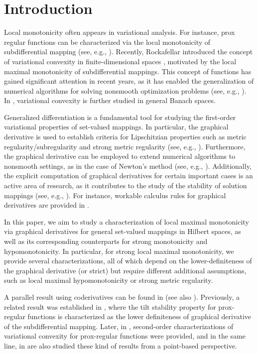 \documentclass[smallextended,envcountsect,envcountsame]{svjour3}
\newcounter{count}
\newcommand{\1}{\mathds{1}}
\begin{document}
	\section{Introduction}
    Local monotonicity often appears in variational analysis. For instance, prox regular functions can be characterized via the local monotonicity of subdifferential mapping (see, e.g., \cite{Poliquin1996, MR2113863}). Recently, Rockafellar introduced the concept of variational convexity in finite-dimensional spaces \cite{MR3995335}, motivated by the local maximal monotonicity of subdifferential mappings. This concept of functions has gained significant attention in recent years, as it has enabled the generalization of numerical algorithms for solving nonsmooth optimization problems (see, e.g., \cite{MR4550949,MR3995335}). In \cite{MR4784083}, variational convexity is further studied in general Banach spaces.

    Generalized differentiation is a fundamental tool for studying the first-order variational properties of set-valued mappings. In particular, the graphical derivative is used to establish criteria for Lipschitzian properties such as metric regularity/subregularity and strong metric regularity (see, e.g., \cite{MR2252233, MR3108434, MR3705353}). Furthermore, the graphical derivative can be employed to extend numerical algorithms to nonsmooth settings, as in the case of Newton's method (see, e.g., \cite{MR4252735, aragon2024coderivative}). Additionally, the explicit computation of graphical derivatives for certain important cases is an active area of research, as it contributes to the study of the stability of solution mappings (see, e.g., \cite{MR3288139, MR3485980, MR4769808}). For instance, workable calculus rules for graphical derivatives are provided in \cite{MR3428695, MR3693740}. 

    In this paper, we aim to study a characterization of local maximal monotonicity via graphical derivatives for general set-valued mappings in Hilbert spaces, as well as its corresponding counterparts for strong monotonicity and hypomonotonicity. In particular, for strong local maximal monotonicity, we provide several characterizations, all of which depend on the lower-definiteness of the graphical derivative (or strict) but require different additional assumptions, such as local maximal hypomonotonicity or strong metric regularity.
    

    A parallel result using coderivatives can be found in \cite[Theorem 3.4]{MR3485980} (see also \cite[Theorem 6.3]{khanh2025local}). Previously, a related result was established in \cite[Theorem 3.3]{MR3843842}, where the tilt stability property for prox-regular functions is characterized as the lower definiteness of graphical derivative of the subdifferential mapping. Later, in \cite[Theorem 4.3]{gfrerer2025}, second-order characterizations of variational convexity for prox-regular functions were provided, and in the same line, in \cite{Rockafellar2025} are also studied these kind of results from a point-based perspective.
\end{document}
